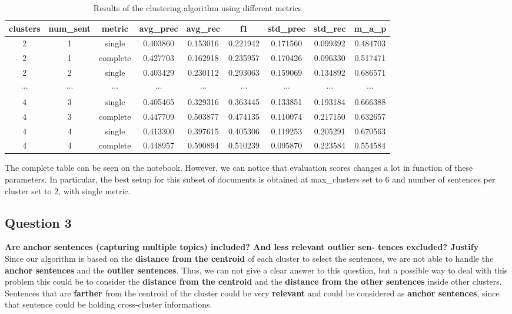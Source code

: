 \begin{table}[H]

  \begin{adjustwidth}{-0.5in}{-.5in}  
  \centering
  \begin{tabular}{|c|c|c|c|c|c|c|c|c|} 
  \hline 
  clusters & num\_sent & metric & avg\_prec & avg\_rec & f1 & std\_prec & std\_rec & m\_a\_p \\
  \hline 
  2 & 1 & single & 0.403860 & 0.153016 & 0.221942 & 0.171560 & 0.099392 & 0.484703 \\
  \hline 
  2 & 1 & complete & 0.427703 & 0.162918 & 0.235957 & 0.170426 & 0.096330 & 0.517471 \\
  \hline 
  2 & 2 & single & 0.403429 & 0.230112 & 0.293063 & 0.159069 & 0.134892 & 0.686571 \\
  \hline
  $\cdots$ & $\cdots$ & $\cdots$ & $\cdots$ & $\cdots$ & $\cdots$ & $\cdots$ & $\cdots$ & $\cdots$ \\
  \hline 
  4 & 3 & single & 0.405465 & 0.329316 & 0.363445 & 0.133851 & 0.193184 & 0.666388 \\
  \hline 
  4 & 3 & complete & 0.447709 & 0.503877 & 0.474135 & 0.110074 & 0.217150 & 0.632657 \\
  \hline 
  4 & 4 & single & 0.413300 & 0.397615 & 0.405306 & 0.119253 & 0.205291 & 0.670563 \\
  \hline 
  4 & 4 & complete & 0.448957 & 0.590894 & 0.510239 & 0.095870 & 0.223584 & 0.554584 \\
  \hline
  \end{tabular}
  \caption{Results of the clustering algorithm using different metrics}

  \end{adjustwidth}
  \end{table}

  The complete table can be seen on the notebook. However, we can notice that evaluation scores changes a lot in function of these parameters. In particular, the best setup for this subset of documents is obtained at max\_clusters set to 6 and number of sentences per cluster set to 2, with single metric. 
\subsection{Question 3}
\textbf{ Are anchor sentences (capturing multiple topics) included? And less relevant outlier sen- tences excluded? Justify} \\
Since our algorithm is based on the \textbf{distance from the centroid} of each
cluster to select the sentences, we are not able to handle the \textbf{anchor
  sentences} and the \textbf{outlier sentences}. Thus, we can not give a clear
answer to this question, but a possible way to deal with this problem this could be to consider
the \textbf{distance from the centroid} and the \textbf{distance from the other
  sentences} inside other clusters. Sentences that are \textbf{farther} from the
centroid of the cluster could be very \textbf{relevant} and could be considered
as \textbf{anchor sentences}, since that sentence could be holding cross-cluster informations.

